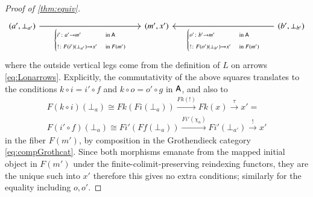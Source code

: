 \documentclass[reqno]{amsart}
\begin{document}
\begin{proof}[Proof of \cref{thm:equiv}]
\begin{equation}
\begin{tikzcd}[row sep=1in,column sep=1.7in,ampersand replacement=\&]
 (a',\bot_{a'})\ar[r,"{\begin{cases}i'\maps a'\to m' &\textrm{in }\A \\!\maps F(i')(\bot_{a'})\to x' &\textrm{in }F(m')\end{cases}}"'] \& (m',x') \& (b',\bot_{b'})\ar[l,"{\begin{cases}o'\maps b'\to m' &\textrm{in }\A \\!\maps F(o')(\bot_{b'})\to x' &\textrm{in }F(m')\end{cases}}"]
 \end{tikzcd}
\end{equation}
where the outside vertical legs come from the definition of $L$ on arrows \cref{eq:Lonarrows}. 
Explicitly, the commutativity of the above squares translates to the conditions $k\circ i=i'\circ f$ and $k\circ o=o'\circ g$ in $\mathsf{A}$, and also to
\begin{gather}\label{eq:Grothcommutativity}
 F(k\circ i)(\bot_a)\cong Fk(Fi(\bot_a))\xrightarrow{Fk(!)}Fk(x)\xrightarrow{\tau}x'= \\
 F(i'\circ f)(\bot_a)\cong Fi'(Ff(\bot_a))\xrightarrow{Fi'(\chi_a)}Fi'(\bot_{a'})\xrightarrow{!}x'\nonumber
\end{gather}
in the fiber $F(m')$, by composition in the Grothendieck category \cref{eq:compGrothcat}. Since both morphisms emanate from the mapped initial object in $F(m')$ under the finite-colimit-preserving reindexing functors, they are the unique such into $x'$ therefore this gives no extra conditions; similarly for the equality including $o,o'$.


\end{proof}
\end{document}
